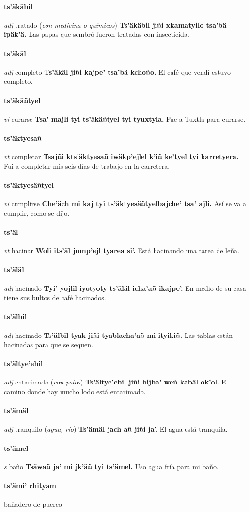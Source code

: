 \documentclass{scrbook}
\newcommand{\entry}[1]{\paragraph{#1}}
\newcommand{\partofspeech}[1]{\textit{#1}}
\newcommand{\spanishtranslation}[1]{#1}
\newcommand{\clarification}[1]{(\textit{#1})}
\newcommand{\cholexample}[1]{\textbf{#1}}
\newcommand{\exampletranslation}[1]{#1}
\begin{document}
\begin{multicols}{2}
\entry{ts'äkäbil}
\partofspeech{adj}
\spanishtranslation{tratado}
\clarification{con medicina o químicos}
\cholexample{Ts'äkäbil jiñi xkamatyilo tsa'bä ipäk'ä.}
\exampletranslation{Las papas que sembró fueron tratadas con insecticida.}

\entry{ts'äkäl}
\partofspeech{adj}
\spanishtranslation{completo}
\cholexample{Ts'äkäl jiñi kajpe' tsa'bä kchoño.}
\exampletranslation{El café que vendí estuvo completo.}

\entry{ts'äkäñtyel}
\partofspeech{vi}
\spanishtranslation{curarse}
\cholexample{Tsa' majli tyi ts'äkäñtyel tyi tyuxtyla.}
\exampletranslation{Fue a Tuxtla para curarse.}

\entry{ts'äktyesañ}
\partofspeech{vt}
\spanishtranslation{completar}
\cholexample{Tsajñi kts'äktyesañ iwäkp'ejlel k'iñ ke'tyel tyi karretyera.}
\exampletranslation{Fui a completar mis seis días de trabajo en la carretera.}

\entry{ts'äktyesäñtyel}
\partofspeech{vi}
\spanishtranslation{cumplirse}
\cholexample{Che'äch mi kaj tyi ts'äktyesäñtyelbajche' tsa' ajli.}
\exampletranslation{Así se va a cumplir, como se dijo.}

\entry{ts'äl}
\partofspeech{vt}
\spanishtranslation{hacinar}
\cholexample{Woli its'äl jump'ejl tyarea si'.}
\exampletranslation{Está hacinando una tarea de leña.}

\entry{ts'äläl}
\partofspeech{adj}
\spanishtranslation{hacinado}
\cholexample{Tyi' yojlil iyotyoty ts'äläl icha'añ ikajpe'.}
\exampletranslation{En medio de su casa tiene sus bultos de café hacinados.}

\entry{ts'älbil}
\partofspeech{adj}
\spanishtranslation{hacinado}
\cholexample{Ts'älbil tyak jiñi tyablacha'añ mi ityikiñ.}
\exampletranslation{Las tablas están hacinadas para que se sequen.}

\entry{ts'ältye'ebil}
\partofspeech{adj}
\spanishtranslation{entarimado}
\clarification{con palos}
\cholexample{Ts'ältye'ebil jiñi bijba' weñ kabäl ok'ol.}
\exampletranslation{El camino donde hay mucho lodo está entarimado.}

\entry{ts'ämäl}
\partofspeech{adj}
\spanishtranslation{tranquilo}
\clarification{agua, río}
\cholexample{Ts'ämäl jach añ jiñi ja'.}
\exampletranslation{El agua está tranquila.}

\entry{ts'ämel}
\partofspeech{s}
\spanishtranslation{baño}
\cholexample{Tsäwañ ja' mi jk'äñ tyi ts'ämel.}
\exampletranslation{Uso agua fría para mi baño.}

\entry{ts'ämi' chityam}
\spanishtranslation{bañadero de puerco}


\end{multicols}
\end{document}
